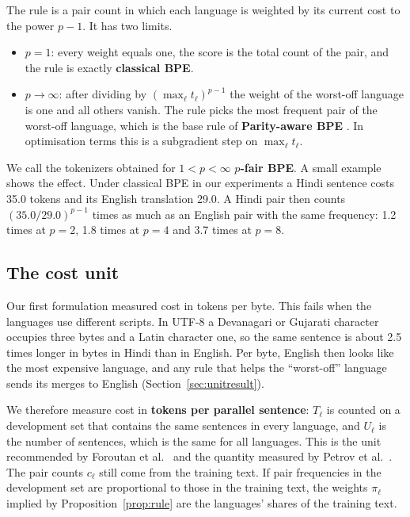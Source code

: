 \documentclass[11pt,a4paper]{article}
\theoremstyle{remark}
\begin{document}
The rule is a pair count in which each language is weighted by its current cost to the
power $p-1$. It has two limits.
\begin{itemize}
  \item $p=1$: every weight equals one, the score is the total count of the pair, and the
  rule is exactly \textbf{classical BPE}.
  \item $p\to\infty$: after dividing by $(\max_\ell t_\ell)^{p-1}$ the weight of the
  worst-off language is one and all others vanish. The rule picks the most frequent pair of
  the worst-off language, which is the base rule of \textbf{Parity-aware BPE}
  \cite{foroutan2026}. In optimisation terms this is a subgradient step on
  $\max_\ell t_\ell$.
\end{itemize}
We call the tokenizers obtained for $1<p<\infty$ \textbf{$p$-fair BPE}. A small example
shows the effect. Under classical BPE in our experiments a Hindi sentence costs 35.0 tokens
and its English translation 29.0. A Hindi pair then counts
$(35.0/29.0)^{p-1}$ times as much as an English pair with the same frequency: 1.2 times at
$p=2$, 1.8 times at $p=4$ and 3.7 times at $p=8$.

\subsection{The cost unit}\label{sec:unit}

Our first formulation measured cost in tokens per byte. This fails when the languages use
different scripts. In UTF-8 a Devanagari or Gujarati character occupies three bytes and a
Latin character one, so the same sentence is about 2.5 times longer in bytes in Hindi than
in English. Per byte, English then looks like the most expensive language, and any rule that
helps the ``worst-off'' language sends its merges to English
(Section~\ref{sec:unitresult}).

We therefore measure cost in \textbf{tokens per parallel sentence}: $T_\ell$ is counted on a
development set that contains the same sentences in every language, and $U_\ell$ is the
number of sentences, which is the same for all languages. This is the unit recommended by
Foroutan et al.\ \cite{foroutan2026} and the quantity measured by Petrov et
al.\ \cite{petrov2023}. The pair counts $c_\ell$ still come from the training text. If pair
frequencies in the development set are proportional to those in the training text, the
weights $\pi_\ell$ implied by Proposition~\ref{prop:rule} are the languages' shares of the
training text.
\end{document}
